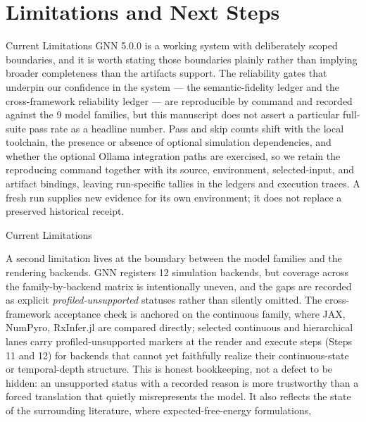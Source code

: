 \documentclass[
  ignorenonframetext,
]{beamer}
\author{\texorpdfstring{}{}}
\date{}
\begin{document}
\section{Limitations and Next Steps}\label{sec:limitations_next_steps}

\begin{frame}{Current Limitations}
\protect{}\label{current-limitations}
GNN 5.0.0 is a working system with deliberately scoped boundaries, and
it is worth stating those boundaries plainly rather than implying
broader completeness than the artifacts support. The reliability gates
that underpin our confidence in the system --- the semantic-fidelity
ledger and the cross-framework reliability ledger --- are reproducible
by command and recorded against the 9 model families, but this
manuscript does not assert a particular full-suite pass rate as a
headline number. Pass and skip counts shift with the local toolchain,
the presence or absence of optional simulation dependencies, and whether
the optional Ollama integration paths are exercised, so we retain the
reproducing command together with its source, environment,
selected-input, and artifact bindings, leaving run-specific tallies in
the ledgers and execution traces. A fresh run supplies new evidence for
its own environment; it does not replace a preserved historical receipt.
\end{frame}

\begin{frame}{Current Limitations}

A second limitation lives at the boundary between the model families and
the rendering backends. GNN registers 12 simulation backends, but
coverage across the family-by-backend matrix is intentionally uneven,
and the gaps are recorded as explicit \emph{profiled-unsupported}
statuses rather than silently omitted. The cross-framework acceptance
check is anchored on the continuous family, where JAX, NumPyro,
RxInfer.jl are compared directly; selected continuous and hierarchical
lanes carry profiled-unsupported markers at the render and execute steps
(Steps 11 and 12) for backends that cannot yet faithfully realize their
continuous-state or temporal-depth structure. This is honest
bookkeeping, not a defect to be hidden: an unsupported status with a
recorded reason is more trustworthy than a forced translation that
quietly misrepresents the model. It also reflects the state of the
surrounding literature, where expected-free-energy formulations,
\end{frame}
\end{document}
